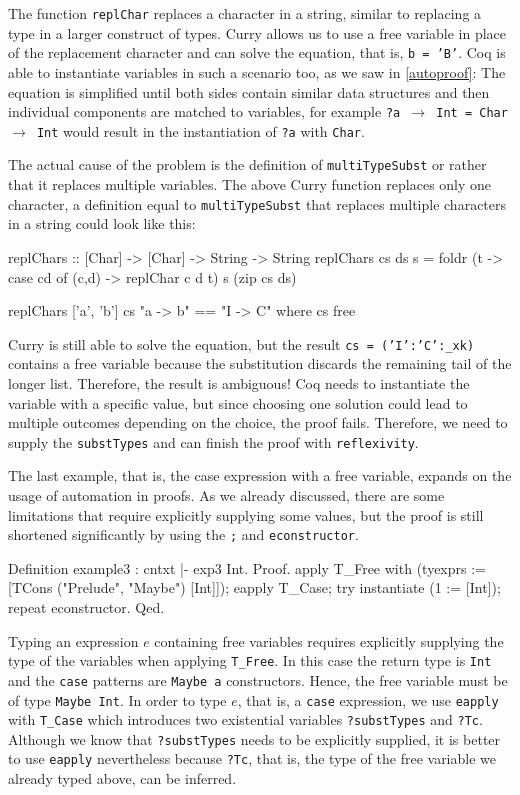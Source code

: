 \documentclass[paper = a4, fleqn, abstract=on, twoside]{scrreprt}
\begin{document}
The function \texttt{replChar} replaces a character in a string, similar to replacing a type in a larger construct of types. Curry allows us to use a free variable in place of the replacement character and can solve the equation, that is, \texttt{{b = 'B'}}. Coq is able to instantiate variables in such a scenario too, as we saw in \autoref{autoproof}: The equation is simplified until both sides contain similar data structures and then individual components are matched to variables, for example \texttt{?a $\rightarrow$ Int = Char $\rightarrow$ Int} would result in the instantiation of \texttt{?a} with \texttt{Char}.
\par
The actual cause of the problem is the definition of \texttt{multiTypeSubst} or rather that it replaces multiple variables. The above Curry function replaces only one character, a definition equal to \texttt{multiTypeSubst} that replaces multiple characters in a string could look like this:
\begin{haskellcode}
replChars :: [Char] -> [Char] -> String -> String
replChars cs ds s =  foldr (\cd t -> case cd of (c,d) -> replChar c d t)
                           s (zip cs ds)
                    
replChars ['a', 'b'] cs "a -> b" == "I -> C" where cs free
\end{haskellcode}
Curry is still able to solve the equation, but the result \texttt{{cs = ('I':'C':\_xk)}} contains a free variable because the substitution discards the remaining tail of the longer list. Therefore, the result is ambiguous! Coq needs to instantiate the variable with a specific value, but since choosing one solution could lead to multiple outcomes depending on the choice, the proof fails. Therefore, we need to supply the \texttt{substTypes} and can finish the proof with \texttt{reflexivity}.\\
\par
The last example, that is, the case expression with a free variable, expands on the usage of automation in proofs. As we already discussed, there are some limitations that require explicitly supplying some values, but the proof is still shortened significantly by using the \texttt{;} and \texttt{econstructor}.
\begin{coqcode}
Definition example3 : cntxt |- exp3 \in Int.
  Proof.
  apply T_Free with (tyexprs := [TCons ("Prelude", "Maybe") [Int]]);
  eapply T_Case;
  try instantiate (1 := [Int]);
  repeat econstructor.
Qed.
\end{coqcode}
Typing an expression $e$ containing free variables requires explicitly supplying the type of the variables when applying \texttt{T\_Free}. In this case the return type is \texttt{Int} and the \texttt{case} patterns are \texttt{Maybe a} constructors. Hence, the free variable must be of type \texttt{Maybe Int}. In order to type $e$, that is, a \texttt{case} expression, we use \texttt{eapply} with \texttt{T\_Case} which introduces two existential variables \texttt{?substTypes} and \texttt{?Tc}. Although we know that \texttt{?substTypes} needs to be explicitly supplied, it is better to use \texttt{eapply} nevertheless because \texttt{?Tc}, that is, the type of the free variable we already typed above, can be inferred.
\end{document}
